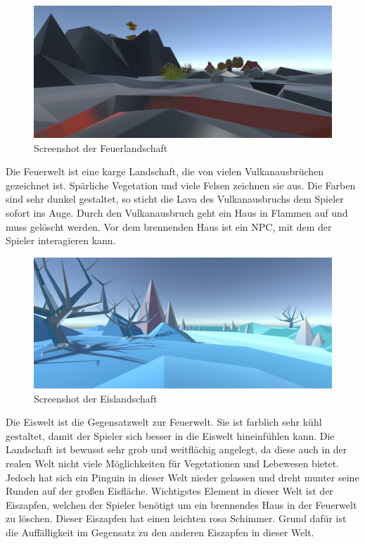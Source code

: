 
\begin{figure}[!htbp]%
	\centering
		\includegraphics[width=1.0\textwidth]{images/Feuer}
	\caption{Screenshot der Feuerlandschaft}
	\label{fig:Feuer}
\end{figure}

Die Feuerwelt ist eine karge Landschaft, die von vielen Vulkanausbrüchen gezeichnet ist. Spärliche Vegetation und viele Felsen zeichnen sie aus.  Die Farben sind sehr dunkel gestaltet, so sticht die Lava des Vulkanausbruchs dem Spieler sofort ins Auge. Durch den Vulkanausbruch geht ein Haus in Flammen auf und muss gelöscht werden. Vor dem brennenden Haus ist ein NPC, mit dem der Spieler interagieren kann.


\begin{figure}[!htbp]
	\centering
		\includegraphics[width=1.0\textwidth]{images/Eis}
	\caption{Screenshot der Eislandschaft}
	\label{fig:Eis}
\end{figure}

Die Eiswelt ist die Gegensatzwelt zur Feuerwelt. Sie ist farblich sehr kühl gestaltet, damit der Spieler sich besser in die Eiswelt hineinfühlen kann. Die Landschaft ist bewusst sehr grob und weitflächig angelegt, da diese auch in der realen Welt nicht viele Möglichkeiten für Vegetationen und Lebewesen bietet. Jedoch hat sich ein Pinguin in dieser Welt nieder gelassen und dreht munter seine Runden auf der großen Eisfläche. Wichtigstes Element in dieser Welt ist der Eiszapfen, welchen der Spieler benötigt um ein brennendes Haus in der Feuerwelt zu löschen. Dieser Eiszapfen hat einen leichten rosa Schimmer. Grund dafür ist die Auffälligkeit im Gegensatz zu den anderen Eiszapfen in dieser Welt.

